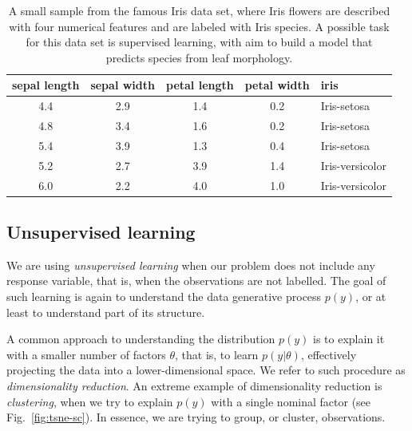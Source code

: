 \begin{refsection}
\begin{table}
\caption{A small sample from the famous Iris data set, where Iris flowers are described with four numerical features and are labeled with Iris species. A possible task for this data set is supervised learning, with aim to build a model that predicts species from leaf morphology.}
\label{tab:iris-sample}
\begin{center}
\begin{tabular}{ccccl}
\toprule
sepal length & sepal width & petal length & petal width & iris \\
\midrule
4.4 & 2.9 & 1.4 & 0.2 & Iris-setosa \\
4.8 & 3.4 & 1.6 & 0.2 & Iris-setosa \\
5.4 & 3.9 & 1.3 & 0.4 & Iris-setosa \\
5.2 & 2.7 & 3.9 & 1.4 & Iris-versicolor \\
6.0 & 2.2 & 4.0 & 1.0 & Iris-versicolor \\
\bottomrule
\end{tabular}
\end{center}
\end{table}

\subsection*{Unsupervised learning}

We are using {\em unsupervised learning} when our problem does not include any response variable, that is, when the observations are not labelled. The goal of such learning is again to understand the data generative process $p(y)$, or at least to understand part of its structure.

A common approach to understanding the distribution $p(y)$ is to explain it with a smaller number of factors $\theta$, that is, to learn $p(y|\theta)$, effectively projecting the data into a lower-dimensional space. We refer to such procedure as {\em dimensionality reduction}. An extreme example of dimensionality reduction is {\em clustering}, when we try to explain $p(y)$ with a single nominal factor (see Fig.~\ref{fig:tsne-sc}). In essence, we are trying to group, or cluster, observations.


\end{refsection}

